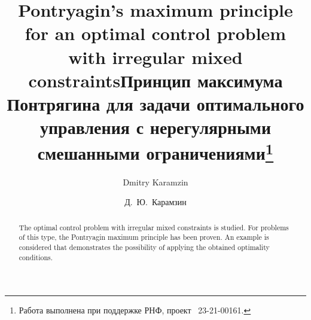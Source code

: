 \begin{englishtitle} %
\title{Pontryagin's maximum principle for an optimal control problem with irregular mixed constraints}
\author{Dmitry Karamzin }

\maketitle

\begin{abstract}
The optimal control problem with irregular mixed constraints is studied. For problems of this type, the Pontryagin maximum principle has been proven. An example is considered that demonstrates the possibility of applying the obtained optimality conditions.

\end{abstract}
\end{englishtitle}

\iffalse
\documentclass[12pt]{llncs}


\usepackage{iftex}

\ifPDFTeX
\usepackage[T2A]{fontenc}
\usepackage[utf8]{inputenc} %
\usepackage[english,russian]{babel}
\fi

\usepackage{todonotes}

\usepackage[russian]{nla}




\fi

\pagebreak

\title{Принцип максимума Понтрягина для задачи оптимального управления с нерегулярными смешанными ограничениями\thanks{Работа выполнена при поддержке РНФ, проект \textnumero~23-21-00161.}}
\author{Д.~Ю.~Карамзин
} %


